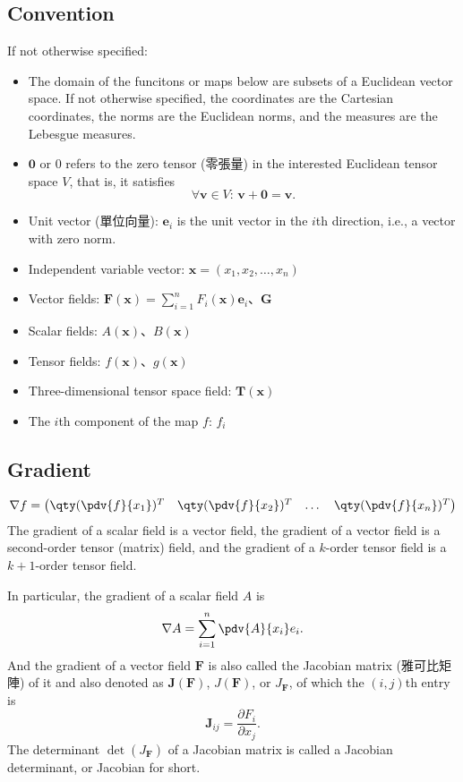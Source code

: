 \documentclass[a4paper,12pt]{report}
\begin{document}
{{{{{{{{{{{{\subsection{Convention}
If not otherwise specified:
\begin{itemize}
\item The domain of the funcitons or maps below are subsets of a Euclidean vector space. If not otherwise specified, the coordinates are the Cartesian coordinates, the norms are the Euclidean norms, and the measures are the Lebesgue measures.
\item $\mathbf{0}$ or $0$ refers to the zero tensor (零張量) in the interested Euclidean tensor space $V$, that is, it satisfies 
\[\forall\mathbf{v}\in V:\,\mathbf{v}+\mathbf{0}=\mathbf{v}.\]
\item Unit vector (單位向量): $\mathbf{e}_i$ is the unit vector in the $i$th direction, i.e., a vector with zero norm.
\item Independent variable vector: $\mathbf{x}=(x_1,x_2,\dots,x_n)$
\item Vector fields: $\mathbf{F}(\mathbf{x}) = \sum_{i=1}^n F_i(\mathbf{x}) \mathbf{e}_i$、$\mathbf{G}$
\item Scalar fields: $A(\mathbf{x})$、$B(\mathbf{x})$
\item Tensor fields: $f(\mathbf{x})$、$g(\mathbf{x})$
\item Three-dimensional tensor space field: $\mathbf{T}(\mathbf{x})$
\item The $i$th component of the map $f$: $f_i$
\end{itemize}
\subsection{Gradient}
\[
\nabla f = \begin{pmatrix}\qty(\pdv{f}{x_1})^T & \qty(\pdv{f}{x_2})^T & \dots  & \qty(\pdv{f}{x_n})^T\end{pmatrix}
\]
The gradient of a scalar field is a vector field, the gradient of a vector field is a second-order tensor (matrix) field, and the gradient of a $k$-order tensor field is a $k+1$-order tensor field. 

In particular, the gradient of a scalar field $A$ is
\[
\nabla A = \sum_{i=1}^n \pdv{A}{x_i}e_i.
\]
And the gradient of a vector field $\mathbf{F}$ is also called the Jacobian matrix (雅可比矩陣) of it and also denoted as $\mathbf{J}(\mathbf{F})$, $J(\mathbf{F})$, or $J_{\mathbf{F}}$, of which the $( i,j )$th entry is
\[\mathbf{J}_{ij}=\frac{\partial F_i}{\partial x_j}.\]
The determinant $\det\left(J_{\mathbf{F}}\right)$ of a Jacobian matrix is called a Jacobian determinant, or Jacobian for short.
}}}}}}}}}}}}
\end{document}
